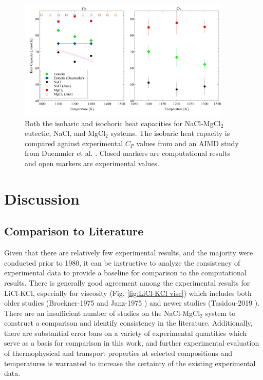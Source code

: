 \documentclass[review]{elsarticle}
\begin{document}
\begin{figure}[h!]
 \centering
 \includegraphics[width=0.9\textwidth]{cv_nacl-mgcl2.jpg} 
 \caption{Both the isobaric and isochoric heat capacities for NaCl-MgCl$_2$ eutectic, NaCl, and MgCl$_2$ systems. The isobaric heat capacity is compared against experimental $C_P$ values from \cite{janz_osti} and an AIMD study from Duemmler et al. \cite{duemmler_naclmgcl}. Closed markers are computational results and open markers are experimental values.}
 \label{fig:nacl-mgcl2 cv}
\end{figure} 

 
\FloatBarrier

\section{Discussion}

\subsection{Comparison to Literature}

Given that there are relatively few experimental results, and the majority were conducted prior to 1980, it can be instructive to analyze the consistency of experimental data to provide a baseline for comparison to the computational results. There is generally good agreement among the experimental results for LiCl-KCl, especially for viscosity (Fig. \ref{fig:LiCl-KCl visc}) which includes both older studies (Brockner-1975 \cite{brockner1975high} and Janz-1975 \cite{janz_visc}) and newer studies (Tasidou-2019 \cite{Tasidou}). There are an insufficient number of studies on the NaCl-MgCl$_2$ system to construct a comparison and identify consistency in the literature. Additionally, there are substantial error bars on a variety of experimental quantities which serve as a basis for comparison in this work, and further experimental evaluation of thermophysical and transport properties at selected compositions and temperatures is warranted to increase the certainty of the existing experimental data.
\end{document}
